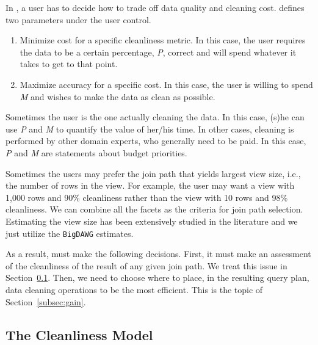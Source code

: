 In \dcv, a user has to decide how to trade off data quality and cleaning cost. 
\dcv defines two parameters under the user control.

\begin{enumerate}
\item Minimize cost for a specific cleanliness metric. In this case, the user requires the data to be a certain percentage, \emph{P}, correct and will spend whatever it takes to get to that point.

\item Maximize accuracy for a specific cost. In this case, the user is willing to spend \emph{M} and wishes to make the data as clean as possible.
\end{enumerate}

Sometimes the user is the one actually cleaning the data. In this case, (s)he can use \emph{P} and \emph{M} to quantify the value of her/his time. 
In other cases, cleaning is performed by other domain experts, who generally need to be paid. In this case, \emph{P} and \emph{M} are statements about budget priorities.

Sometimes the users may prefer the join path that yields largest view size, i.e., the number of rows in the view. For example, the user may want a view with 1,000 rows and 90\% cleanliness rather than the view with 10 rows and 98\% cleanliness. We can combine all the facets as the criteria for join path selection. Estimating the view size has been extensively studied in the literature and we just utilize the \texttt{BigDAWG} estimates.

As a result, \dcv must make the following decisions. First, it must make an assessment of the cleanliness of the result of any given join path. We treat this issue in Section~\ref{subsec:model}. Then, we need to choose where to place, in the resulting query plan, data cleaning operations to be the most efficient. This is the topic of Section~\ref{subsec:gain}.


\subsection{The Cleanliness Model}\label{subsec:model}

